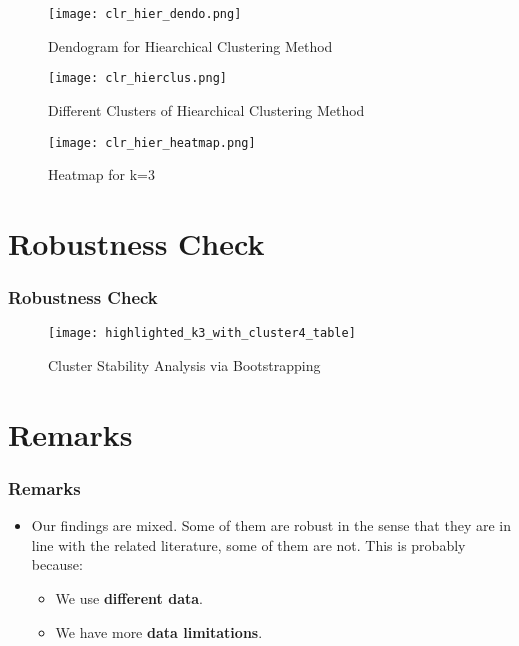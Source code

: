 \documentclass[
	11pt, %
]{beamer}
\begin{document}
\begin{frame}
    \begin{figure}
        \centering
        \texttt{[image: clr\_hier\_dendo.png]}
        \caption{Dendogram for Hiearchical Clustering Method}
        \label{fig:clr_hier_dendo}
    \end{figure}
\end{frame}

\begin{frame}
    \begin{figure}
        \centering
        \texttt{[image: clr\_hierclus.png]}
        \caption{Different Clusters of Hiearchical Clustering Method}
        \label{fig:clr_hierclus}
    \end{figure}
\end{frame}

\begin{frame}
   \begin{figure}
       \centering
       \texttt{[image: clr\_hier\_heatmap.png]}
       \caption{Heatmap for k=3}
       \label{fig:clr_hier_heatmap}
   \end{figure}
\end{frame}



\section{Robustness Check}
\begin{frame}
    \frametitle{Robustness Check}
  \begin{figure}
      \centering
      \texttt{[image: highlighted\_k3\_with\_cluster4\_table]}
      \caption{Cluster Stability Analysis via Bootstrapping}
      \label{fig:bootstrap}
  \end{figure}
\end{frame}

\section{Remarks}
\begin{frame}
    \frametitle{Remarks}
\begin{itemize}
\item Our findings are mixed. Some of them are robust in the sense that they are in line with the related literature, some of them are not. This is probably because:
\begin{itemize}
    \item We use \textbf{different data}.
    \item We have more \textbf{data limitations}.    
\end{itemize}
\end{itemize}
    
   
\end{frame}
\end{document}
